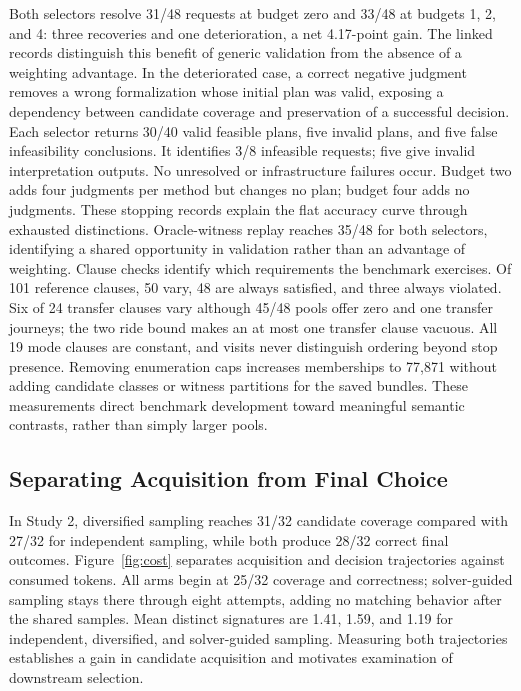 \documentclass[a4paper,twoside]{article}
\begin{document}
Both selectors resolve 31/48 requests at budget zero and 33/48 at budgets 1, 2, and 4: three recoveries and one deterioration, a net 4.17-point gain. The linked records distinguish this benefit of generic validation from the absence of a weighting advantage. In the deteriorated case, a correct negative judgment removes a wrong formalization whose initial plan was valid, exposing a dependency between candidate coverage and preservation of a successful decision.
Each selector returns 30/40 valid feasible plans, five invalid plans, and five false infeasibility conclusions. It identifies 3/8 infeasible requests; five give invalid interpretation outputs. No unresolved or infrastructure failures occur. Budget two adds four judgments per method but changes no plan; budget four adds no judgments. These stopping records explain the flat accuracy curve through exhausted distinctions. Oracle-witness replay reaches 35/48 for both selectors, identifying a shared opportunity in validation rather than an advantage of weighting.
Clause checks identify which requirements the benchmark exercises. Of 101 reference clauses, 50 vary, 48 are always satisfied, and three always violated. Six of 24 transfer clauses vary although 45/48 pools offer zero and one transfer journeys; the two ride bound makes an at most one transfer clause vacuous. All 19 mode clauses are constant, and visits never distinguish ordering beyond stop presence. Removing enumeration caps increases memberships to 77,871 without adding candidate classes or witness partitions for the saved bundles. These measurements direct benchmark development toward meaningful semantic contrasts, rather than simply larger pools.



\subsection{Separating Acquisition from Final Choice}

In Study 2, diversified sampling reaches 31/32 candidate coverage compared with 27/32 for independent sampling, while both produce 28/32 correct final outcomes. Figure~\ref{fig:cost} separates acquisition and decision trajectories against consumed tokens. All arms begin at 25/32 coverage and correctness; solver-guided sampling stays there through eight attempts, adding no matching behavior after the shared samples. Mean distinct signatures are 1.41, 1.59, and 1.19 for independent, diversified, and solver-guided sampling. Measuring both trajectories establishes a gain in candidate acquisition and motivates examination of downstream selection.
\end{document}
